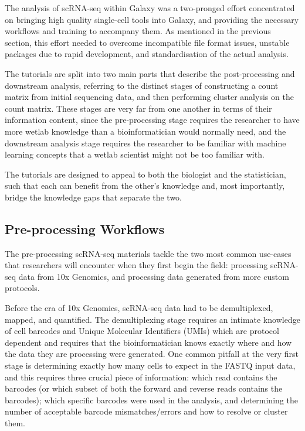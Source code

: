 \documentclass[a4paper,num-refs]{oup-contemporary}
\begin{document}
The analysis of scRNA-seq within Galaxy was a two-pronged effort concentrated on bringing high quality single-cell tools into Galaxy, and providing the necessary workflows and training to accompany them. As mentioned in the previous section, this effort needed to overcome incompatible file format issues, unstable packages due to rapid development, and standardisation of the actual analysis.


The tutorials are split into two main parts that describe the post-processing and downstream analysis, referring to the distinct stages of constructing a count matrix from initial sequencing data, and then performing cluster analysis on the count matrix. These stages are very far from one another in terms of their information content, since the pre-processing stage requires the researcher to have more wetlab knowledge than a bioinformatician would normally need, and the downstream analysis stage requires the researcher to be familiar with machine learning concepts that a wetlab scientist might not be too familiar with.

The tutorials are designed to appeal to both the biologist and the statistician, such that each can benefit from the other's knowledge and, most importantly, bridge the knowledge gaps that separate the two.

\subsection{Pre-processing Workflows}

The pre-processing scRNA-seq materials tackle the two most common use-cases that researchers will encounter when they first begin the field: processing scRNA-seq data from 10x Genomics, and processing data generated from more custom protocols.

Before the era of 10x Genomics, scRNA-seq data had to be demultiplexed, mapped, and quantified. The demultiplexing stage requires an intimate knowledge of cell barcodes and Unique Molecular Identifiers (UMIs) which are protocol dependent and requires that the bioinformatician knows exactly where and how the data they are processing were generated. One common pitfall at the very first stage is determining exactly how many cells to expect in the FASTQ input data, and this requires three crucial piece of information: which read contains the barcodes (or which subset of both the forward and reverse reads contains the barcodes); which specific barcodes were used in the analysis, and determining the number of acceptable barcode mismatches/errors and how to resolve or cluster them.
\end{document}
